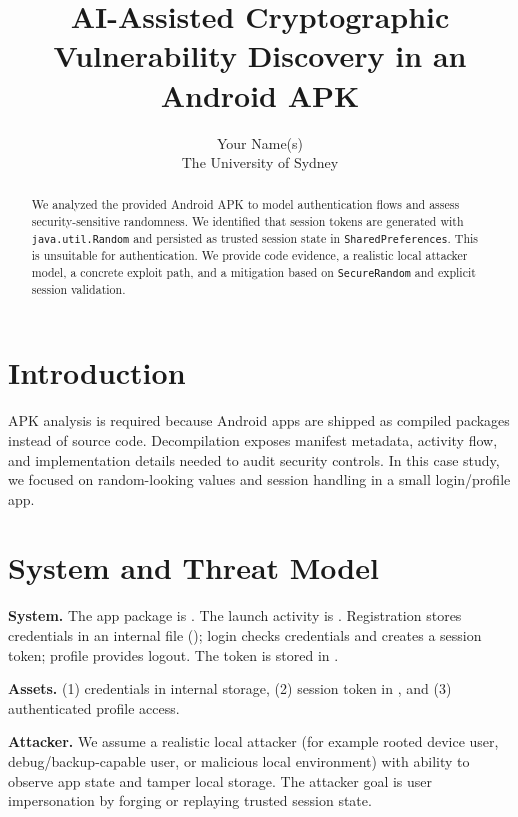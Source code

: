 \documentclass[letterpaper,twocolumn,10pt]{article}
\title{AI-Assisted Cryptographic Vulnerability Discovery in an Android APK}
\author{
{\rm Your Name(s)}\\
The University of Sydney
}
\date{}
\begin{document}
\maketitle

\begin{abstract}
We analyzed the provided Android APK to model authentication flows and assess security-sensitive randomness. We identified that session tokens are generated with \texttt{java.util.Random} and persisted as trusted session state in \texttt{SharedPreferences}. This is unsuitable for authentication. We provide code evidence, a realistic local attacker model, a concrete exploit path, and a mitigation based on \texttt{SecureRandom} and explicit session validation.
\end{abstract}

\section{Introduction}
APK analysis is required because Android apps are shipped as compiled packages instead of source code. Decompilation exposes manifest metadata, activity flow, and implementation details needed to audit security controls. In this case study, we focused on random-looking values and session handling in a small login/profile app.

\section{System and Threat Model}
\begin{flushleft}
\textbf{System.} The app package is . The launch activity is . Registration stores credentials in an internal file (); login checks credentials and creates a session token; profile provides logout. The token is stored in .

\textbf{Assets.} (1) credentials in internal storage, (2) session token in , and (3) authenticated profile access.

\textbf{Attacker.} We assume a realistic local attacker (for example rooted device user, debug/backup-capable user, or malicious local environment) with ability to observe app state and tamper local storage. The attacker goal is user impersonation by forging or replaying trusted session state.
\end{flushleft}
\end{document}
